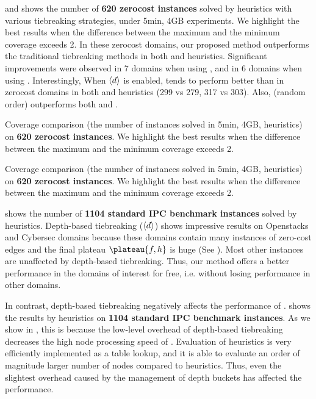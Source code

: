  and  shows the number of \textbf{620 zerocost
instances} solved by \lmcut heuristics with various tiebreaking strategies, under 5min, 4GB experiments. We
highlight the best results when the difference between the maximum and the minimum coverage exceeds 2. In these
zerocost domains, our proposed method outperforms the traditional tiebreaking methods in both \lmcut and \mands
heuristics.  Significant improvements were observed in 7 domains when using \lmcut, and in 6 domains when using
\mands.
Interestingly, When ${\left<d\right>}$ is enabled, \fifo tends to perform better than \lifo in zerocost domains in both
\lmcut and \mands heuristics (299 vs 279, 317 vs 303). Also, \ro (random order) outperforms both \fifo and \lifo.

\begin{table}[htbp]
 {
 \centering
 
  \caption{
 Coverage comparison (the number of instances solved in 5min, 4GB, \lmcut heuristics) 
 on \textbf{620 zerocost instances}. We highlight the
 best results when the difference between the maximum and the minimum coverage exceeds 2.
 }
 \label{tbl:lmcut-zerocost-full}
 }
\end{table}

\begin{table}[htbp]
 {
 \centering
 
  \caption{
 Coverage comparison (the number of instances solved in 5min, 4GB, \mands heuristics)
 on \textbf{620 zerocost instances}. We highlight the
 best results when the difference between the maximum and the minimum coverage exceeds 2.
 }
 \label{tbl:mands-zerocost-full}
 }
\end{table}

 shows the number of \textbf{1104 standard IPC benchmark instances} solved by \lmcut
heuristics. Depth-based tiebreaking (${\left<d\right>}$) shows impressive results on Openstacks and Cybersec domains because
these domains contain many instances of zero-cost edges and the final plateau $\plateau{f,h}$ is huge (See
).  Most other instances are unaffected by depth-based tiebreaking.  Thus, our method offers a
better performance in the domains of interest for free, i.e. without losing performance in other domains.

In contrast, depth-based tiebreaking negatively affects the performance of \mands.
 shows the results by \mands heuristics on \textbf{1104 standard
IPC benchmark instances}.
% 
As we show in , this is because the low-level overhead of depth-based tiebreaking
decreases the high node processing speed of \mands. Evaluation of \mands heuristics is very efficiently implemented
as a table lookup, and it is able to evaluate an order of magnitude larger number of nodes compared to \lmcut
heuristics. Thus, even the slightest overhead caused by the management of depth buckets has affected
the performance.

